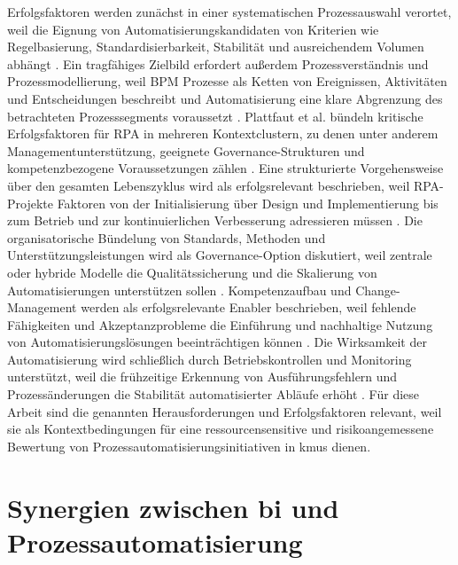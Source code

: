 Erfolgsfaktoren werden zunächst in einer systematischen Prozessauswahl verortet, weil die Eignung von Automatisierungskandidaten von Kriterien wie Regelbasierung, Standardisierbarkeit, Stabilität und ausreichendem Volumen abhängt \cite{Wanner2019ProcessSelection,AalstBichlerHeinzl2018RPA}. 
Ein tragfähiges Zielbild erfordert außerdem Prozessverständnis und Prozessmodellierung, weil BPM Prozesse als Ketten von Ereignissen, Aktivitäten und Entscheidungen beschreibt und Automatisierung eine klare Abgrenzung des betrachteten Prozesssegments voraussetzt \cite{DumasEtAl2013}. 
Plattfaut et al. bündeln kritische Erfolgsfaktoren für RPA in mehreren Kontextclustern, zu denen unter anderem Managementunterstützung, geeignete Governance-Strukturen und kompetenzbezogene Voraussetzungen zählen \cite{Plattfaut2022CSF_RPA}. 
Eine strukturierte Vorgehensweise über den gesamten Lebenszyklus wird als erfolgsrelevant beschrieben, weil RPA-Projekte Faktoren von der Initialisierung über Design und Implementierung bis zum Betrieb und zur kontinuierlichen Verbesserung adressieren müssen \cite{Schlegel2024SuccessfulBPA}. 
Die organisatorische Bündelung von Standards, Methoden und Unterstützungsleistungen wird als Governance-Option diskutiert, weil zentrale oder hybride Modelle die Qualitätssicherung und die Skalierung von Automatisierungen unterstützen sollen \cite{Kedziora2021GovernanceModelsRPA}. 
Kompetenzaufbau und Change-Management werden als erfolgsrelevante Enabler beschrieben, weil fehlende Fähigkeiten und Akzeptanzprobleme die Einführung und nachhaltige Nutzung von Automatisierungslösungen beeinträchtigen können \cite{OECD2021SMEsGoingDigital,Plattfaut2022CSF_RPA}. 
Die Wirksamkeit der Automatisierung wird schließlich durch Betriebskontrollen und Monitoring unterstützt, weil die frühzeitige Erkennung von Ausführungsfehlern und Prozessänderungen die Stabilität automatisierter Abläufe erhöht \cite{Schlegel2024RatingRisksRPA,COSO2025RPAICIF}. 
Für diese Arbeit sind die genannten Herausforderungen und Erfolgsfaktoren relevant, weil sie als Kontextbedingungen für eine ressourcensensitive und risikoangemessene Bewertung von Prozessautomatisierungsinitiativen in \glspl{kmu} dienen.



\section{Synergien zwischen \gls{bi} und Prozessautomatisierung}\label{sec:bi-proc-connection}

